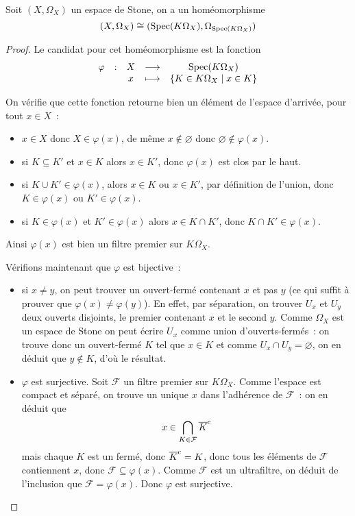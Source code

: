 \begin{lemma}
  Soit $(X,\Omega_X)$ un espace de Stone, on a un homéomorphisme
  \[(X,\Omega_X)\cong (\operatorname{Spec}(K\Omega_X),\Omega_{\operatorname{Spec}(K\Omega_X)})\]
\end{lemma}

\begin{proof}
  Le candidat pour cet homéomorphisme est la fonction
  \[\begin{array}{ccccc}
  \varphi & : & X & \longrightarrow & \operatorname{Spec}(K\Omega_X)\\
  & & x & \longmapsto & \{K \in K\Omega_X\mid x \in K\}
  \end{array}\]

  On vérifie que cette fonction retourne bien un élément de l'espace d'arrivée,
  pour tout $x\in X$~:
  \begin{itemize}
  \item $x\in X$ donc $X\in \varphi(x)$, de même $x\notin\varnothing$ donc
    $\varnothing\notin\varphi(x)$.
  \item si $K\subseteq K'$ et $x\in K$ alors $x\in K'$, donc $\varphi(x)$ est
    clos par le haut.
  \item si $K\cup K' \in \varphi(x)$, alors $x\in K$ ou $x\in K'$, par
    définition de l'union, donc $K\in\varphi(x)$ ou $K'\in\varphi(x)$.
  \item si $K\in\varphi(x)$ et $K'\in\varphi(x)$ alors $x\in K\cap K'$, donc
    $K\cap K'\in\varphi(x)$.
  \end{itemize}
  Ainsi $\varphi(x)$ est bien un filtre premier sur $K\Omega_X$.

  Vérifions maintenant que $\varphi$ est bijective~:
  \begin{itemize}
  \item si $x\neq y$, on peut trouver un ouvert-fermé contenant $x$ et pas $y$
    (ce qui suffit à prouver que $\varphi(x)\neq\varphi(y)$). En effet, par
    séparation, on trouver $U_x$ et $U_y$ deux ouverts disjoints, le premier
    contenant $x$ et le second $y$. Comme $\Omega_X$ est un espace de Stone on
    peut écrire $U_x$ comme union d'ouverts-fermés~: on trouve donc un
    ouvert-fermé $K$ tel que $x\in K$ et comme $U_x\cap U_y=\varnothing$, on en
    déduit que $y\notin K$, d'où le résultat.
  \item $\varphi$ est surjective. Soit $\mathcal F$ un filtre premier sur
    $K\Omega_X$. Comme l'espace est compact et séparé, on trouve un unique
    $x$ dans l'adhérence de $\mathcal F$~: on en déduit que
    \[x\in\bigcap_{K\in \mathcal F}\overline{K}^{\mathrm c}\]
    mais chaque $K$ est un fermé, donc $\overline{K}^{\mathrm c} = K$, donc tous les éléments
    de $\mathcal F$ contiennent $x$, donc $\mathcal F\subseteq \varphi(x)$.
    Comme $\mathcal F$ est un ultrafiltre, on déduit de l'inclusion que
    $\mathcal F = \varphi(x)$. Donc $\varphi$ est surjective.
  \end{itemize}


\end{proof}
